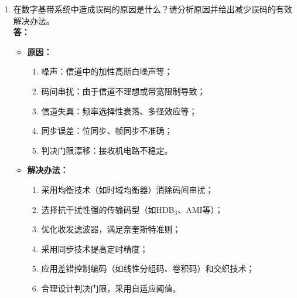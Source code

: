 \documentclass[a4paper,11pt]{ctexart}
\begin{document}
\begin{enumerate}
    \item 在数字基带系统中造成误码的原因是什么？请分析原因并给出减少误码的有效解决办法。\\
    \textbf{答：} 
    \begin{itemize}
        \item \textbf{原因：} 
            \begin{enumerate}
                \item 噪声：信道中的加性高斯白噪声等；
                \item 码间串扰：由于信道不理想或带宽限制导致；
                \item 信道失真：频率选择性衰落、多径效应等；
                \item 同步误差：位同步、帧同步不准确；
                \item 判决门限漂移：接收机电路不稳定。
            \end{enumerate}
        \item \textbf{解决办法：}
            \begin{enumerate}
                \item 采用均衡技术（如时域均衡器）消除码间串扰；
                \item 选择抗干扰性强的传输码型（如HDB$_3$、AMI等）；
                \item 优化收发滤波器，满足奈奎斯特准则；
                \item 采用同步技术提高定时精度；
                \item 应用差错控制编码（如线性分组码、卷积码）和交织技术；
                \item 合理设计判决门限，采用自适应阈值。
            \end{enumerate}
    \end{itemize}


\end{enumerate}
\end{document}
